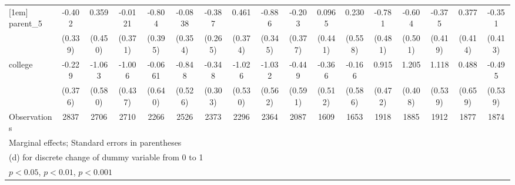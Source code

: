 {\begin{tabular}{l*{16}{c}}
[1em]
parent\_5            &      -0.402         &       0.359         &     -0.0121         &      -0.804\sym{*}  &     -0.0838         &      -0.387         &       0.461         &      -0.886\sym{*}  &      -0.203         &      0.0965         &       0.230         &      -0.781         &      -0.604         &      -0.375         &       0.377         &      -0.351         \\
                    &     (0.339)         &     (0.450)         &     (0.371)         &     (0.395)         &     (0.354)         &     (0.265)         &     (0.374)         &     (0.345)         &     (0.377)         &     (0.441)         &     (0.558)         &     (0.481)         &     (0.501)         &     (0.419)         &     (0.414)         &     (0.413)         \\
[1em]
college             &      -0.229         &      -1.063         &      -1.006\sym{*}  &     -0.0661         &      -0.848         &      -0.348         &      -1.026         &      -1.032         &      -0.449         &      -0.366         &      -0.166         &       0.915         &       1.205\sym{**} &       1.118\sym{*}  &       0.488         &      -0.495         \\
                    &     (0.376)         &     (0.580)         &     (0.437)         &     (0.640)         &     (0.526)         &     (0.303)         &     (0.530)         &     (0.562)         &     (0.591)         &     (0.512)         &     (0.586)         &     (0.472)         &     (0.408)         &     (0.539)         &     (0.659)         &     (0.539)         \\
\hline
Observations        &        2837         &        2706         &        2710         &        2266         &        2526         &        2373         &        2296         &        2364         &        2087         &        1609         &        1653         &        1918         &        1885         &        1912         &        1877         &        1874         \\
\hline\hline
\multicolumn{17}{l}{\footnotesize Marginal effects; Standard errors in parentheses}\\
\multicolumn{17}{l}{\footnotesize  (d) for discrete change of dummy variable from 0 to 1}\\
\multicolumn{17}{l}{\footnotesize \sym{*} \(p<0.05\), \sym{**} \(p<0.01\), \sym{***} \(p<0.001\)}\\
\end{tabular}
}
